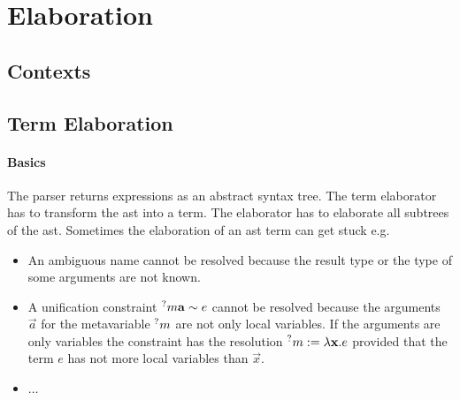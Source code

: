 \section{Elaboration}


\begin{comment}
    Proof carrying elaboration
    ------------------------------------------------------------

    An elaboration context consists of
    - Set of modules
    - Set of contexts
        - bound variables with types
        - set of metavariables with types
        - set of constructed terms with types in this context
        - set of subtype or equivalence pairs

    A term is a pair (context-id, term number) or an axiomatic term.

    Axiomatic terms: Prop, Any u, Uni. Axiomatic terms don't need a context.
    They are welltyped and wellformed by axiom.

    Gamma |- t1: T1, t2, T2, ....
\end{comment}




\subsection{Contexts}


\subsection{Term Elaboration}


\paragraph{Basics}

The parser returns expressions as an abstract syntax tree. The term elaborator
has to transform the ast into a  term. The elaborator has to elaborate all
subtrees of the ast. Sometimes the elaboration of an ast term can get stuck e.g.
\begin{itemize}
    \item An ambiguous name cannot be resolved because the result type or the
        type of some arguments are not known.

    \item A unification constraint ${{}^?m} {\mathbf a} \sim e$ cannot be resolved
        because the arguments $\vec a$ for the metavariable ${{}^?m}$ are not
        only local variables. If the arguments are only variables the constraint
        has the resolution ${{}^?m} := \lambda {\mathbf x}. e$ provided that the term
        $e$ has not more local variables than $\vec x$.

    \item $\ldots$
\end{itemize}

